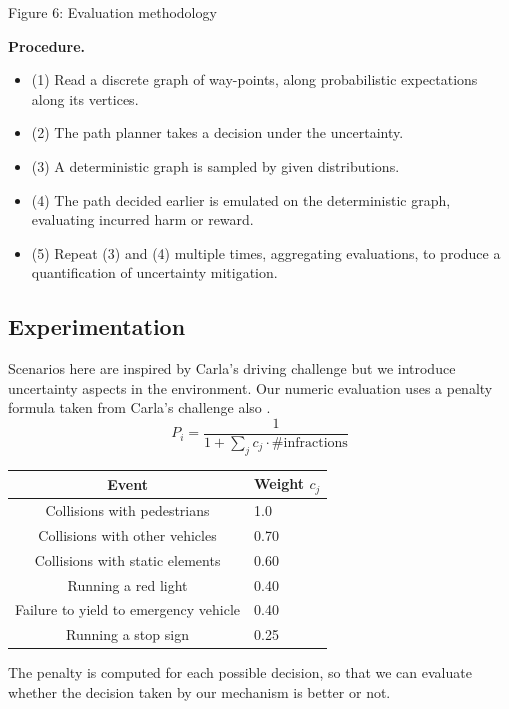 \documentclass[pdflatex,sn-mathphys-num]{sn-jnl}%
\renewenvironment{table}[1][]%
{\tableorg[#1]%
\tablebodyfont%
\renewcommand\footnotetext[2][]{{\removelastskip\vskip3pt%
\let\tablebodyfont\tablefootnotefont%
\hskip0pt\if!##1!\else{\smash{$^{##1}$}}\fi##2\par}}%
}{\endtableorg}
\begin{document}
\begin{center}
  
  Figure 6: Evaluation methodology
\end{center}

\textbf{Procedure.}
\begin{itemize}
    \item (1) Read a discrete graph of way-points, along probabilistic expectations along its vertices.
    \item (2) The path planner takes a decision under the uncertainty.
    \item (3) A deterministic graph is sampled by given distributions.
    \item (4) The path decided earlier is emulated on the deterministic graph, evaluating incurred harm or reward.
    \item (5) Repeat (3) and (4) multiple times, aggregating evaluations, to produce a quantification of uncertainty mitigation.
\end{itemize}

\subsection{Experimentation} \label{Experimentation}

Scenarios here are inspired by Carla's driving challenge \cite{scenarios-carla} but we introduce uncertainty aspects in the environment. Our numeric evaluation uses a penalty formula taken from Carla's challenge also \cite{eval-carla}.
$$
P_i = \frac{1}{1 + \sum_j c_j \cdot \text{\#infractions} }
$$
\begin{table}[h]
\centering
\begin{tabular}{cl}
\toprule
\textbf{Event} & \textbf{Weight $c_j$} \\
\midrule
Collisions with pedestrians & 1.0 \\
Collisions with other vehicles & 0.70 \\
Collisions with static elements & 0.60 \\
Running a red light & 0.40 \\
Failure to yield to emergency vehicle & 0.40 \\
Running a stop sign &0.25 \\
\bottomrule
\end{tabular}
\caption{Penalty Weights}
\label{table:1}
\end{table}

The penalty is computed for each possible decision, so that we can evaluate whether the decision taken by our mechanism is better or not.
\end{document}
